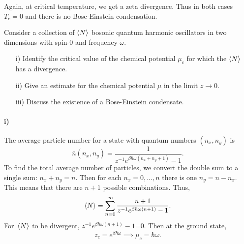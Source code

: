            Again, at critical temperature, we get a zeta divergence. Thus in both cases $T_c=0$ and there is no Bose-Einstein condensation.
        \begin{eocproblem*}{}
            Consider a collection of $\langle N \rangle$ bosonic quantum harmonic oscillators in two dimensions with spin-0 and frequency $\omega$.
            \begin{enumerate}
                \item[i)] Identify the critical value of the chemical potential $\mu_c$ for which the $\langle N \rangle$ has a divergence.
                \item[ii)] Give an estimate for the chemical potential $\mu$ in the limit $z\to0$. 
                \item[iii)] Discuss the existence of a Bose-Einstein condensate.   
            \end{enumerate}
        \end{eocproblem*}
            \paragraph{i)}
            The average particle number for a state with quantum numbers $(n_x,n_y)$ is
            \begin{equation}
                \bar{n}(n_x,n_y) = \frac{1}{z^{-1}e^{\beta\hbar\omega(n_x+n_y+1)}-1}.
            \end{equation}
            To find the total average number of particles, we convert the double sum to a single sum: $n_x+n_y=n$. Then for each $n_x=0,...,n$ there is one $n_y=n-n_x$. This means that there are $n+1$ possible combinations. Thus, 
            \begin{equation}
                \langle N \rangle = \sum_{n=0}^{\infty}\frac{n+1}{z^{-1}e^{\beta\hbar\omega(n+1)}-1}.
            \end{equation} 
            For $\langle N \rangle$ to be divergent, $z^{-1}e^{\beta\hbar\omega(n+1)}-1$=0. Then at the ground state,
            \begin{equation}
                z_c = e^{\beta\hbar\omega} \implies \mu_c = \hbar\omega.
            \end{equation}

